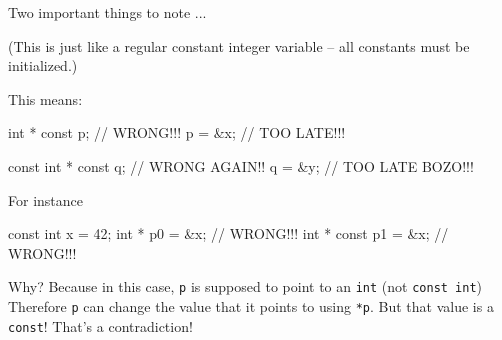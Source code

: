 Two important things to note ...

 (This is just like a regular constant integer variable -- all constants must be initialized.)

This means:

\begin{consolethree}[escapeinside=||]
int * const p;          // WRONG!!!
p = &x;                 // TOO LATE!!!

const int * const q;    // WRONG AGAIN!!
q = &y;                 // TOO LATE BOZO!!!
\end{consolethree}
 For instance

\begin{consolethree}[escapeinside=||]
const int x = 42;
int * p0 = &x;       // WRONG!!!
int * const p1 = &x; // WRONG!!! 
\end{consolethree}

Why? Because in this case, \texttt{p} is supposed to point to an \texttt{int} (not \texttt{const int}) Therefore \texttt{p} can change the value that it points to using \texttt{*p}. But that value is a \texttt{const}! That's a contradiction!






